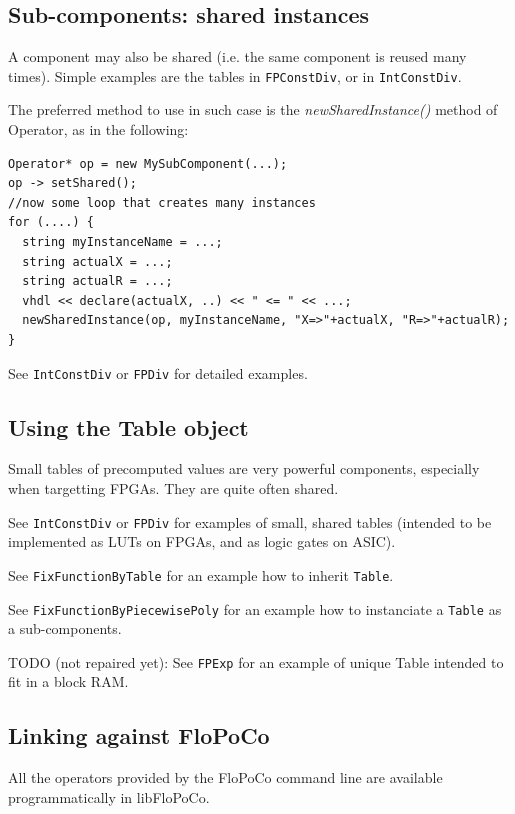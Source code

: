 \documentclass{article}
\begin{document}
\subsection{Sub-components: shared instances}

A component may also be shared (i.e. the same component is reused many times).
Simple examples are the tables in \texttt{FPConstDiv}, or in \texttt{IntConstDiv}.

The preferred method to use in such case is the \emph{newSharedInstance()} method of Operator, as in the following:
\begin{verbatim}
Operator* op = new MySubComponent(...);
op -> setShared();
//now some loop that creates many instances
for (....) {
  string myInstanceName = ...; 
  string actualX = ...;
  string actualR = ...;
  vhdl << declare(actualX, ..) << " <= " << ...;   
  newSharedInstance(op, myInstanceName, "X=>"+actualX, "R=>"+actualR);
}
\end{verbatim}

See \texttt{IntConstDiv} or \texttt{FPDiv} for detailed examples.

\subsection{Using the Table object}
Small tables of precomputed values are very powerful components, especially when targetting FPGAs.
They are quite often shared.

See \texttt{IntConstDiv} or \texttt{FPDiv} for examples of small, shared tables (intended to be implemented as LUTs on FPGAs, and as logic gates on ASIC).

See \texttt{FixFunctionByTable} for an example how to inherit \texttt{Table}.

See \texttt{FixFunctionByPiecewisePoly} for an example how to instanciate a \texttt{Table} as a sub-components.

TODO (not repaired yet): See \texttt{FPExp} for an example of unique Table intended to fit in a block RAM.




\subsection{Linking against FloPoCo\label{sec:linking}}
All the operators provided by the FloPoCo command line are available programmatically in libFloPoCo.
\end{document}
